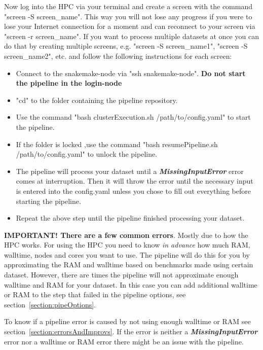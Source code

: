 Now log into the HPC via your terminal and create a screen with the command "screen -S screen\_name". This way you will not lose any progress if you were to lose your Internet connection for a moment and can reconnect to your screen via "screen -r screen\_name". If you want to process multiple datasets at once you can do that by creating multiple screens, e.g. "screen -S screen\_name1", "screen -S screen\_name2", etc. and follow the following instructions for each screen:
\begin{itemize}
	\item Connect to the snakemake-node via "ssh snakemake-node". \textbf{Do not start the pipeline in the login-node}
	\item "cd" to the folder containing the pipeline repository.
	\item Use the command "bash clusterExecution.sh /path/to/config.yaml" to start the pipeline.
	\item If the folder is locked ,use the command "bash resumePipeline.sh /path/to/config.yaml" to unlock the pipeline.
	\item The pipeline will process your dataset until a \textbf{\textit{MissingInputError}} error comes at interruption. Then it will throw the error until the necessary input is entered into the config.yaml unless you chose to fill out everything before starting the pipeline.
	\item Repeat the above step until the pipeline finished processing your dataset.
\end{itemize}
\textbf{IMPORTANT! There are a few common errors}. Mostly due to how the HPC works. For using the HPC you need to know \textit{in advance} how much RAM, walltime, nodes and cores you want to use. The pipeline will do this for you by approximating the RAM and walltime based on benchmarks made using certain dataset. However, there are times the pipeline will not approximate enough walltime and RAM for your dataset. In this case you can add additional walltime or RAM to the step that failed in the pipeline options, see section~\ref{section:pipeOptions}. 

To know if a pipeline error is caused by not using enough walltime or RAM see section~\ref{section:errorsAndImprovs}. If the error is neither a \textbf{\textit{MissingInputError}} error nor a walltime or RAM error there might be an issue with the pipeline. 